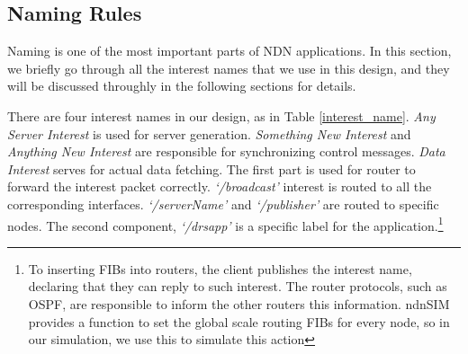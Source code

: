 \documentclass[conference]{IEEEtran}
\begin{document}
\subsection{Naming Rules}
Naming is one of the most important parts of NDN applications. In this section, we briefly go through all the interest names that we use in this design, and they will be discussed throughly in the following sections for details.

There are four interest names in our design, as in Table \ref{interest_name}. \emph{Any Server Interest} is used for server generation. \emph{Something New Interest} and \emph{Anything New Interest} are responsible for synchronizing control messages. \emph{Data Interest} serves for actual data fetching. The first part is used for router to forward the interest packet correctly. \emph{`/broadcast'} interest is routed to all the corresponding interfaces. \emph{`/serverName'} and \emph{`/publisher'} are routed to specific nodes. The second component, \emph{`/drsapp'} is a specific label for the application.\footnote{To inserting FIBs into routers, the client publishes the interest name, declaring that they can reply to such interest. The router protocols, such as OSPF\cite{OSPF}\cite{OSPFN}, are responsible to inform the other routers this information. ndnSIM provides a function to set the global scale routing FIBs for every node, so in our simulation, we use this to simulate this action}
\end{document}
